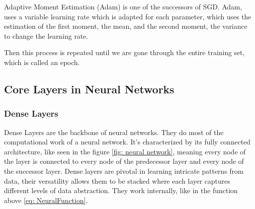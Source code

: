 Adaptive Moment Estimation (Adam)\cite{kingma_adam_2017} is one of the successors of SGD. Adam, uses a variable learning rate which is adapted for each parameter, which uses the estimation of the first moment, the mean, and the second moment, the variance to change the learning rate.

Then this process is repeated until we are gone through the entire training set, which is called an epoch.

\subsection{Core Layers in Neural Networks}\label{subsec:core-layers-in-neural-networks}

\subsubsection{Dense Layers}
Dense Layers are the backbone of neural networks.
They do most of the computational work of a neural network.
It's characterized by its fully connected architecture, like seen in the figure \ref{fig: neural network}, meaning every node of the layer is connected to every node of the predecessor layer and every node of the successor layer.
Dense layers are pivotal in learning intricate patterns from data, their versatility allows them to be stacked where each layer captures different levels of data abstraction.
They work internally, like in the function above \ref{eq: NeuralFunction}.

